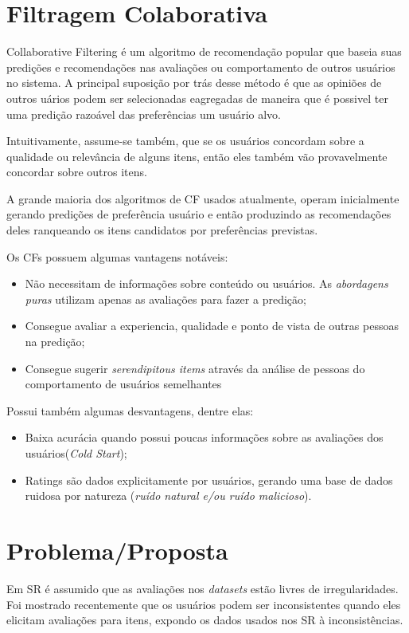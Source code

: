 \documentclass{sig-alternate}
\begin{document}
\section{Filtragem Colaborativa}
Collaborative Filtering é um algoritmo de recomendação popular que baseia suas predições e
recomendações nas avaliações ou comportamento de outros usuários no sistema. A principal
suposição por trás desse método é que as opiniões de outros uários podem ser selecionadas eagregadas de maneira que é possivel ter uma predição razoável das preferências um usuário alvo.

Intuitivamente, assume-se também, que se os usuários concordam sobre a qualidade ou relevância de alguns itens, então eles também vão provavelmente concordar sobre outros itens.

A grande maioria dos algoritmos de CF usados atualmente, operam inicialmente gerando
predições de preferência usuário e então produzindo as recomendações deles ranqueando os
itens candidatos por preferências previstas.

Os CFs possuem algumas vantagens notáveis:
\begin{itemize}
	\item Não necessitam de informações sobre conteúdo ou usuários. As  \emph{abordagens puras} utilizam apenas as avaliações para fazer a predição;
	\item Consegue avaliar a experiencia, qualidade e ponto de vista de outras pessoas na predição;
	\item Consegue sugerir \emph{serendipitous items} através da análise de pessoas do comportamento de usuários semelhantes
\end{itemize}
Possui também algumas desvantagens, dentre elas:
\begin{itemize}
	\item Baixa acurácia quando possui poucas informações sobre as avaliações dos usuários(\emph{Cold Start});
	\item Ratings são dados explicitamente por usuários, gerando uma base de dados ruidosa por natureza (\emph{ruído natural e/ou ruído malicioso}).
\end{itemize}

\section{Problema/Proposta}
Em SR é assumido que as avaliações nos \emph{datasets} estão livres de irregularidades. Foi mostrado recentemente que os usuários podem ser inconsistentes quando eles elicitam avaliações para itens, expondo os dados usados nos SR à inconsistências.
\end{document}
